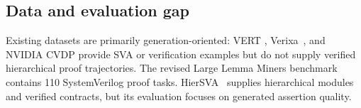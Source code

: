 \subsection{Data and evaluation gap}

Existing datasets are primarily generation-oriented: VERT
\cite{menon2025vert}, Verixa~\cite{verixa2025}, and NVIDIA CVDP
\cite{nvidiacvdp2025} provide SVA or verification examples but do not supply
verified hierarchical proof trajectories. The revised Large Lemma Miners
benchmark~\cite{peled2026lemmaminers} contains 110 SystemVerilog proof
tasks. HierSVA~\cite{hiersva2026} supplies hierarchical modules and verified
contracts, but its evaluation focuses on generated assertion quality.
